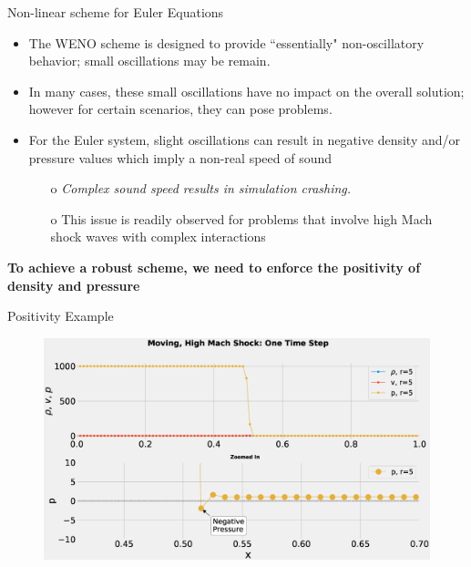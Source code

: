 \documentclass[10pt]{beamer}
\begin{document}
\begin{frame}{Non-linear scheme for Euler Equations}
  \begin{itemize}
    \item The WENO scheme is designed to provide ``essentially" non-oscillatory behavior; small oscillations may be remain.
    \item In many cases, these small oscillations have no impact on the overall solution; however for certain scenarios, they can pose problems.
    \item For the Euler system, slight oscillations can result in negative density and/or pressure values which imply a non-real speed of sound
    \begin{itemize}
      \item[o] \textit{Complex sound speed results in simulation crashing.}
      \item[o] This issue is readily observed for problems that involve high Mach shock waves with complex interactions
    \end{itemize}  
  \end{itemize}
  \textbf{To achieve a robust scheme, we need to enforce the positivity of density and pressure}
\end{frame}

\begin{frame}{Positivity Example}
  \begin{figure}[H]
    \centering
    \includegraphics[scale=0.275]{PositivityZoom.eps}
    \end{figure}
\end{frame}


\end{document}
